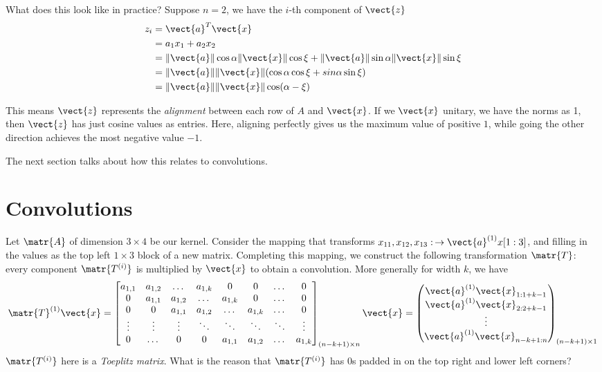 What does this look like in practice?
Suppose $n=2$, we have the $i$-th component of $\vect{z}$ 
\begin{align}
z_i & = \vect{a}^T\vect{x} \\
& = a_1x_1 + a_2x_2 \\
&= \Vert\vect{a}\Vert \cos \alpha \Vert\vect{x}\Vert \cos\xi + \Vert\vect{a}\Vert \sin \alpha  \Vert\vect{x}\Vert \sin\xi \\
&= \Vert\vect{a}\Vert\Vert\vect{x}\Vert (\cos\alpha \cos\xi + sin\alpha \sin\xi) \\
&=\Vert\vect{a}\Vert \Vert\vect{x}\Vert\cos(\alpha-\xi)
\end{align}


This means $\vect{z}$ represents the \emph{alignment} between each row of $A$ and $\vect{x}$.
If we $\vect{x}$ unitary, we have the norms as 1, then $\vect{z}$ has just cosine values as entries.
Here, aligning perfectly gives us the maximum value of positive $1$, while going the other direction achieves the most negative value $-1$.

The next section talks about how this relates to convolutions.
\section{Convolutions}
Let $\matr{A}$ of dimension $3\times 4$ be our kernel. Consider the mapping that transforms $x_{11}, x_{12}, x_{13}:\, \to \vect{a}^{(1)} x[1:3]$, and filling in the values as the top left $1\times 3$ block of a new matrix. Completing this mapping, we construct the following transformation $\matr{T}$: every component $\matr{T^{(i)}}$ is multiplied by $\vect{x}$ to obtain a convolution. More generally for width $k$, we have
\[
\matr{T}^{(1)}\vect{x} =
\begin{bmatrix}
    a_{1,1} & a_{1,2} & \dotsc & a_{1,k} & 0 & 0 & \dotsc & 0 \\
    0 & a_{1,1} & a_{1,2} & \dotsc & a_{1,k} & 0 & \dotsc & 0 \\
    0 & 0 & a_{1,1} & a_{1,2} & \dotsc & a_{1,k} & \dotsc & 0 \\
    \vdots & \vdots & \vdots & \ddots & \ddots & \ddots & \ddots & \vdots \\
    0 & \dotsc & 0 & 0 & a_{1,1} & a_{1,2} & \dotsc & a_{1,k}
\end{bmatrix}_{(n-k+1) \times n} \vect{x}=
\begin{pmatrix}
    \vect{a}^{(1)} \vect{x}_{1:1+k-1} \\ \vect{a}^{(1)} \vect{x}_{2:2+k-1} \\ \vdots \\ \vect{a}^{(1)}  \vect{x}_{n-k+1:n}
\end{pmatrix}_{(n-k+1) \times 1}
\]
$\matr{T^{(i)}}$ here is a \textit{Toeplitz matrix}. What is the reason that $\matr{T^{(i)}}$ has $0$s padded in on the top right and lower left corners?

